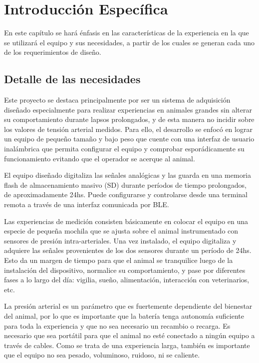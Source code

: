 \chapter{Introducción Específica} %

\label{Chapter2}


En este capítulo se hará énfasis en las características de la experiencia en la que se utilizará el equipo y sus necesidades, a partir  de los cuales se generan cada uno de los requerimientos de diseño.

\section{Detalle de las necesidades}

Este proyecto se destaca principalmente por ser un sistema de adquisición diseñado especialmente para realizar experiencias en animales grandes sin alterar su comportamiento durante lapsos prolongados, y de esta manera no incidir sobre los valores de tensión arterial medidos. Para ello, el desarrollo se enfocó en lograr un equipo de pequeño tamaño y bajo peso que cuente con una interfaz de usuario inalámbrica que permita configurar el equipo y comprobar esporádicamente su funcionamiento evitando que el operador se acerque al animal. 

El equipo diseñado digitaliza las señales analógicas y las guarda en una memoria flash de almacenamiento masivo (SD) durante períodos de tiempo prolongados, de aproximadamente 24hs. Puede configurarse y controlarse desde una terminal remota a través de una interfaz comunicada por BLE.

Las experiencias de medición consisten básicamente en colocar el equipo en una especie de pequeña mochila que se ajusta sobre el animal instrumentado con sensores de presión intra-arteriales. Una vez instalado, el equipo digitaliza y adquiere las señales provenientes de los dos sensores durante un período de 24hs. Esto da un margen de tiempo para que el animal se tranquilice luego de la instalación del dispositivo, normalice su comportamiento, y pase por diferentes fases a lo largo del día: vigilia, sueño, alimentación, interacción con veterinarios, etc. 

La presión arterial es un parámetro que es fuertemente dependiente del bienestar del animal, por lo que es importante que la batería tenga autonomía suficiente para toda la experiencia y que no sea necesario un recambio o recarga. Es necesario que sea portátil para que el animal no esté conectado a ningún equipo a través de cables. Como se trata de una experiencia larga, también es importante que el equipo no sea pesado, voluminoso, ruidoso, ni se caliente. 

